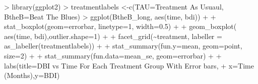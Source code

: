 \documentclass[
]{article}
\newenvironment{Shaded}{\begin{snugshade}}{\end{snugshade}}
\newcommand{\AttributeTok}[1]{\textcolor[rgb]{0.77,0.63,0.00}{#1}}
\newcommand{\DecValTok}[1]{\textcolor[rgb]{0.00,0.00,0.81}{#1}}
\newcommand{\FloatTok}[1]{\textcolor[rgb]{0.00,0.00,0.81}{#1}}
\newcommand{\FunctionTok}[1]{\textcolor[rgb]{0.00,0.00,0.00}{#1}}
\newcommand{\NormalTok}[1]{#1}
\newcommand{\OtherTok}[1]{\textcolor[rgb]{0.56,0.35,0.01}{#1}}
\newcommand{\SpecialCharTok}[1]{\textcolor[rgb]{0.00,0.00,0.00}{#1}}
\newcommand{\StringTok}[1]{\textcolor[rgb]{0.31,0.60,0.02}{#1}}
\begin{document}
\begin{Shaded}
\begin{Highlighting}[]
\SpecialCharTok{\textgreater{}} \FunctionTok{library}\NormalTok{(ggplot2)}
\SpecialCharTok{\textgreater{}}\NormalTok{ treatmentlabels }\OtherTok{\textless{}{-}}\FunctionTok{c}\NormalTok{(}\StringTok{\textquotesingle{}TAU\textquotesingle{}}\OtherTok{=}\StringTok{\textquotesingle{}Treatment As Usuaul\textquotesingle{}}\NormalTok{, }\StringTok{\textquotesingle{}BtheB\textquotesingle{}}\OtherTok{=}\StringTok{\textquotesingle{}Beat The Blues\textquotesingle{}}\NormalTok{)}
\SpecialCharTok{\textgreater{}} \FunctionTok{ggplot}\NormalTok{(BtheB\_long, }\FunctionTok{aes}\NormalTok{(time, bdi)) }\SpecialCharTok{+} 
\SpecialCharTok{+}   \FunctionTok{stat\_boxplot}\NormalTok{(}\AttributeTok{geom=}\StringTok{\textquotesingle{}errorbar\textquotesingle{}}\NormalTok{, }\AttributeTok{linetype=}\DecValTok{1}\NormalTok{, }\AttributeTok{width=}\FloatTok{0.5}\NormalTok{) }\SpecialCharTok{+} 
\SpecialCharTok{+}   \FunctionTok{geom\_boxplot}\NormalTok{( }\FunctionTok{aes}\NormalTok{(time, bdi),}\AttributeTok{outlier.shape=}\DecValTok{1}\NormalTok{) }\SpecialCharTok{+} 
\SpecialCharTok{+}   \FunctionTok{facet\_grid}\NormalTok{(}\SpecialCharTok{\textasciitilde{}}\NormalTok{treatment, }\AttributeTok{labeller =} \FunctionTok{as\_labeller}\NormalTok{(treatmentlabels)) }\SpecialCharTok{+}  
\SpecialCharTok{+}   \FunctionTok{stat\_summary}\NormalTok{(}\AttributeTok{fun.y=}\NormalTok{mean, }\AttributeTok{geom=}\StringTok{\textquotesingle{}point\textquotesingle{}}\NormalTok{, }\AttributeTok{size=}\DecValTok{2}\NormalTok{) }\SpecialCharTok{+} 
\SpecialCharTok{+}   \FunctionTok{stat\_summary}\NormalTok{(}\AttributeTok{fun.data=}\NormalTok{mean\_se, }\AttributeTok{geom=}\StringTok{\textquotesingle{}errorbar\textquotesingle{}}\NormalTok{) }\SpecialCharTok{+} 
\SpecialCharTok{+}   \FunctionTok{labs}\NormalTok{(}\AttributeTok{title=}\StringTok{\textquotesingle{}DBI vs Time For Each Treatment Group With Error bars\textquotesingle{}}\NormalTok{, }
\SpecialCharTok{+}        \AttributeTok{x=}\StringTok{\textquotesingle{}Time (Months)\textquotesingle{}}\NormalTok{,}\AttributeTok{y=}\StringTok{\textquotesingle{}BDI\textquotesingle{}}\NormalTok{)}
\end{Highlighting}
\end{Shaded}
\end{document}
